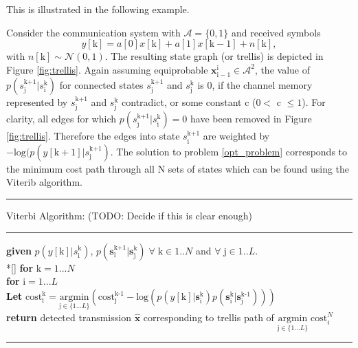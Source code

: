 \documentclass[12pt,a4paper]{report}
\begin{document}
This is illustrated in the following example. 
   \par
   Consider the communication system with $\mathcal{A}=\{0, 1\}$ and received symbols 
   \begin{equation*}
y[\text{k}] =  a[\text{0}]x[\text{k}] + a[\text{1}]x[\text{k}-1] + n[\text{k}],
\end{equation*}
with $n[\text{k}] \sim \mathcal{N}(0,1)$.
The resulting state graph (or trellis) is depicted in Figure \ref{fig:trellis}. 
Again assuming equiprobable 
$\mathbf{x}_{\mathrm{i-1}}^{\mathrm{i}} \in \mathcal{A}^{\text{2}}$, the value of $p(s_{\text{j}}^{\text{k+1}}|s_{\text{i}}^{\text{k}})$ for connected states $s_{\text{j}}^{\text{k+1}}$ and $s_{\text{j}}^{\text{k}}$ is  0, if the channel memory represented by $s_{\text{j}}^{\text{k+1}}$ and $s_{\text{j}}^{\text{k}}$ contradict, or some constant c ($0<$ c $\leq1$). For clarity, all edges for which $p(s_{\text{j}}^{\text{k+1}}|s_{\text{i}}^{\text{k}})=0$ have been removed in Figure \ref{fig:trellis}. Therefore the edges into state $s_{\text{i}}^{\text{k+1}}$ are weighted by
$-\text{log}(p(y[\text{k}+1]|s_{\text{j}}^{\text{k+1}})$. The solution to problem \ref{opt_problem} corresponds to the minimum cost path through all N sets of states which can be found using the Viterib algorithm. 
\\

    \noindent\rule[16pt]{\textwidth}{0.6pt}
	Viterbi Algorithm: (TODO: Decide if this is clear enough)

    \noindent\rule[10pt]{\textwidth}{0.4pt}
    {\footnotesize
    \begin{tabbing}
        {\bf given} $p(y[\text{k}]|s_{\text{i}}^{\text{k}})$, $p(\mathbf{s}_{\text{l}}^{\text{k+1}}|\mathbf{s}_{\text{j}}^{\text{k}}) \; \forall  \; \text{k} \in {1..N}$ and $ \forall \; \text{j} \in {1..L}$. \\*[\smallskipamount]
        {\textbf{for}  $\text{k} = 1... N $} \\
         \qquad \= {\textbf{for} $\text{i} = 1... L$}\\
        \qquad \qquad \= \textbf{Let} $\text{cost}_{\text{i}}^{\text{k}} = \underset{\text{j} \in \{1...L\}} {\text{argmin}}\left( \text{cost}_{\text{j}}^{\text{k-1}}
        -\text{log}(p(y[\text{k}]|\mathbf{s}_{\text{i}}^{\text{k}})p(\mathbf{s}_{\text{i}}^{\text{k}}|\mathbf{s}_{\text{j}}^{\text{k-1}}))
        \right)$ \\
        {\bf return} detected transmission $\hat{\mathbf{x}}$ corresponding to trellis path of $\underset{\text{j} \in \{1...L\}} {\text{argmin}} \; \text{cost}_{i}^N $
    \end{tabbing}}
    \noindent\rule[10pt]{\textwidth}{0.4pt}
\end{document}

